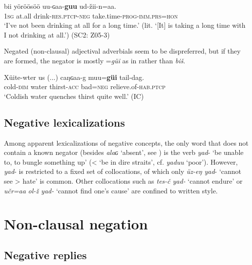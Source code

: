 \documentclass[output=paper,colorlinks,citecolor=brown,chinesefont]{langscibook}
\begin{document}
\ea\label{ex:kha:46}
    \gll bii yöröösöö uu-ɢaa-\textbf{guu} ud-žii-n=aa. \\ 
         \textsc{1sg} at.all drink-\textsc{res.ptcp-neg} take.time-\textsc{prog-imm.prs=hon} \\
    \glt ‘I’ve not been drinking at all for a long time.’ (lit. ‘[It] is taking a long time with I not drinking at all.’) (SC2: Z05-3)
\z 
 
Negated (non-clausal) adjectival adverbials seem to be dispreferred, but if they are formed, the negator is mostly =\textit{güi} as in  rather than \textit{biš}. 

\ea\label{ex:kha:47}
    \gll Xüite-wter us (...) caŋɢaa-g muu=\textbf{güi} tail-dag. \\ 
         cold-\textsc{dim} water {} thirst-\textsc{acc} bad=\textsc{neg} relieve.of-\textsc{hab.ptcp} \\
    \glt ‘Coldish water quenches thirst quite well.’ (IC)
\z 
 
\subsection{Negative lexicalizations}\label{sec:kha:2.5}

Among apparent lexicalizations of negative concepts, the only word that does not contain a known negator (besides \textit{alaɢ} ‘absent’, see ) is the verb \textit{yad}- ‘be unable to, to bungle something up’ (< ‘be in dire straits’, cf. \textit{yaduu} ‘poor’). However, \textit{yad}{}- is restricted to a fixed set of collocations, of which only \textit{üz-eŋ yad}{}- ‘cannot see > hate’ is common. Other collocations such as \textit{tes-č yad-} ‘cannot endure’ or \textit{učr=aa} \textit{ol-ž yad-} ‘cannot find one’s cause’ are confined to written style. 

\section{Non-clausal negation}\label{sec:kha:3}
\subsection{Negative replies}\label{sec:kha:3.1}
\end{document}
